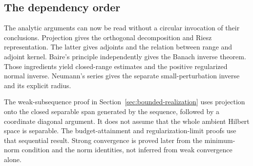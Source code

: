 \subsection{The dependency order}
The analytic arguments can now be read without a circular invocation of their conclusions. Projection gives the orthogonal decomposition and Riesz representation. The latter gives adjoints and the relation between range and adjoint kernel. Baire's principle independently gives the Banach inverse theorem. Those ingredients yield closed-range estimates and the positive regularized normal inverse. Neumann's series gives the separate small-perturbation inverse and its explicit radius.

The weak-subsequence proof in Section~\ref{sec:bounded-realization} uses projection onto the closed separable span generated by the sequence, followed by a coordinate diagonal argument. It does not assume that the whole ambient Hilbert space is separable. The budget-attainment and regularization-limit proofs use that sequential result. Strong convergence is proved later from the minimum-norm condition and the norm identities, not inferred from weak convergence alone.
